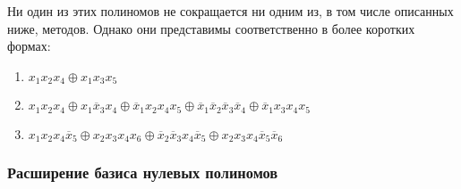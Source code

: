 \documentclass[a4paper,12pt,titlepage,finall]{article}
\begin{document}
Ни один из этих полиномов не сокращается ни одним из, в том числе описанных ниже, методов. Однако они представимы соответственно в более коротких формах:
\begin{enumerate}
    \item $ x_1 x_2 x_4 \oplus x_1 x_3 x_5 $
    \item $ x_1 x_2 x_4 \oplus x_1 \overline x_3 x_4 \oplus \overline x_1 x_2 x_4 x_5 \oplus \overline x_1 \overline x_2 \overline x_3 \overline x_4 \oplus \overline x_1 x_3 x_4 x_5 $
    \item $ x_1 x_2 x_4 \overline x_5 \oplus x_2 x_3 x_4 x_6 \oplus \overline x_2 \overline x_3 x_4 \overline x_5 \oplus x_2 x_3 x_4 \overline x_5 \overline x_6 $
\end{enumerate}

\subsubsection{Расширение базиса нулевых полиномов}
\end{document}
